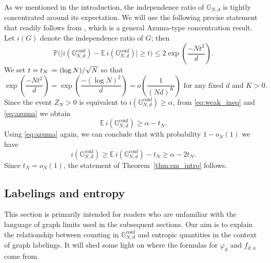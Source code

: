 \documentclass[12pt]{amsart}
\theoremstyle{definition}
\newcommand\Eb{\mathbb{E}}  %
\newcommand\Pb{\mathbb{P}}  %
\newcommand\Gb{\mathbb{G}}
\newcommand\Gbconf{\mathbb{G}^{\textrm{conf}}}
\newcommand\al{\alpha}
\newcommand\be{\beta}
\newcommand{\defeq}{\mathrel{\vcenter{\baselineskip0.5ex \lineskiplimit0pt
                     \hbox{\scriptsize.}\hbox{\scriptsize.}}}%
                     =}
\begin{document}
As we mentioned in the introduction, the independence ratio of $\Gb_{N,d}$ is tightly concentrated around its expectation. We will use the following precise statement that readily follows from \cite[Theorem 2.19]{wormald1999survey}, which is a general Azuma-type concentration result. Let $i(G)$ denote the independence ratio of $G$; then 
%
\begin{equation} \label{eq:azuma}
\Pb\bigg( \big|i(\Gbconf_{N,d}) - \Eb \, i(\Gbconf_{N,d}) \big| \geq t \bigg) 
\leq 2 \exp\left( \frac{-Nt^2}{d} \right) .
\end{equation}
%
We set $t = t_N \defeq (\log N)/\sqrt{N}$ so that 
%
\[ \exp\left( \frac{-Nt^2}{d} \right) 
= \exp\left( \frac{-(\log N)^2}{d} \right) 
= o \left( \frac{1}{(Nd)^K} \right) 
\text{ for any fixed $d$ and $K>0$.} \]
%
Since the event $Z_N>0$ is equivalent to $i(\Gbconf_{N,d}) \geq \al$, from \eqref{eq:weak_ineq} and \eqref{eq:azuma} we obtain  
%
\[ \Eb \, i(\Gbconf_{N,d}) \geq \al - t_N .\]
%
Using \eqref{eq:azuma} again, we can conclude that with probability $1-o_N(1)$ we have 
%
\[ i(\Gbconf_{N,d}) 
\geq \Eb \, i(\Gbconf_{N,d}) - t_N 
\geq \al - 2t_N .\]
%
Since $t_N=o_N(1)$, the statement of Theorem~\ref{thm:sm_intro} follows.

\subsection{Labelings and entropy} \label{sec:labelings}

This section is primarily intended for readers who are unfamiliar with the language of graph limits used in the subsequent sections. Our aim is to explain the relationship between counting in $\Gbconf_{N,d}$ and entropic quantities in the context of graph labelings. %
It will shed some light on where the formulas for $\varphi_d$ and $f_{d,\al}$ come from.
\end{document}
